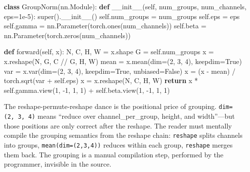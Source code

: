 \documentclass[11pt,titlepage]{article}
\newenvironment{Shaded}{}{}
\newcommand{\BuiltInTok}[1]{#1}
\newcommand{\ControlFlowTok}[1]{\textcolor[rgb]{0.00,0.44,0.13}{\textbf{#1}}}
\newcommand{\DecValTok}[1]{\textcolor[rgb]{0.25,0.63,0.44}{#1}}
\newcommand{\FloatTok}[1]{\textcolor[rgb]{0.25,0.63,0.44}{#1}}
\newcommand{\FunctionTok}[1]{\textcolor[rgb]{0.02,0.16,0.49}{#1}}
\newcommand{\KeywordTok}[1]{\textcolor[rgb]{0.00,0.44,0.13}{\textbf{#1}}}
\newcommand{\NormalTok}[1]{#1}
\newcommand{\OperatorTok}[1]{\textcolor[rgb]{0.40,0.40,0.40}{#1}}
\newcommand{\VariableTok}[1]{\textcolor[rgb]{0.10,0.09,0.49}{#1}}
\begin{document}
\begin{Shaded}
\begin{Highlighting}[]
\KeywordTok{class}\NormalTok{ GroupNorm(nn.Module):}
    \KeywordTok{def} \FunctionTok{__init__}\NormalTok{(}\VariableTok{self}\NormalTok{, num_groups, num_channels, eps}\OperatorTok{=}\FloatTok{1e-5}\NormalTok{):}
        \BuiltInTok{super}\NormalTok{().}\FunctionTok{__init__}\NormalTok{()}
        \VariableTok{self}\NormalTok{.num_groups }\OperatorTok{=}\NormalTok{ num_groups}
        \VariableTok{self}\NormalTok{.eps }\OperatorTok{=}\NormalTok{ eps}
        \VariableTok{self}\NormalTok{.gamma }\OperatorTok{=}\NormalTok{ nn.Parameter(torch.ones(num_channels))}
        \VariableTok{self}\NormalTok{.beta }\OperatorTok{=}\NormalTok{ nn.Parameter(torch.zeros(num_channels))}

    \KeywordTok{def}\NormalTok{ forward(}\VariableTok{self}\NormalTok{, x):}
\NormalTok{        N, C, H, W }\OperatorTok{=}\NormalTok{ x.shape}
\NormalTok{        G }\OperatorTok{=} \VariableTok{self}\NormalTok{.num_groups}
\NormalTok{        x }\OperatorTok{=}\NormalTok{ x.reshape(N, G, C }\OperatorTok{//}\NormalTok{ G, H, W)}
\NormalTok{        mean }\OperatorTok{=}\NormalTok{ x.mean(dim}\OperatorTok{=}\NormalTok{(}\DecValTok{2}\NormalTok{, }\DecValTok{3}\NormalTok{, }\DecValTok{4}\NormalTok{), keepdim}\OperatorTok{=}\VariableTok{True}\NormalTok{)}
\NormalTok{        var }\OperatorTok{=}\NormalTok{ x.var(dim}\OperatorTok{=}\NormalTok{(}\DecValTok{2}\NormalTok{, }\DecValTok{3}\NormalTok{, }\DecValTok{4}\NormalTok{), keepdim}\OperatorTok{=}\VariableTok{True}\NormalTok{, unbiased}\OperatorTok{=}\VariableTok{False}\NormalTok{)}
\NormalTok{        x }\OperatorTok{=}\NormalTok{ (x }\OperatorTok{-}\NormalTok{ mean) }\OperatorTok{/}\NormalTok{ torch.sqrt(var }\OperatorTok{+} \VariableTok{self}\NormalTok{.eps)}
\NormalTok{        x }\OperatorTok{=}\NormalTok{ x.reshape(N, C, H, W)}
        \ControlFlowTok{return}\NormalTok{ x }\OperatorTok{*} \VariableTok{self}\NormalTok{.gamma.view(}\DecValTok{1}\NormalTok{, }\DecValTok{-1}\NormalTok{, }\DecValTok{1}\NormalTok{, }\DecValTok{1}\NormalTok{) }\OperatorTok{+} \VariableTok{self}\NormalTok{.beta.view(}\DecValTok{1}\NormalTok{, }\DecValTok{-1}\NormalTok{, }\DecValTok{1}\NormalTok{, }\DecValTok{1}\NormalTok{)}
\end{Highlighting}
\end{Shaded}

The reshape-permute-reshape dance is the positional price of grouping.
\texttt{dim=(2,\ 3,\ 4)} means ``reduce over channel\_per\_group,
height, and width''---but those positions are only correct after the
reshape. The reader must mentally compile the grouping semantics from
the reshape chain: \texttt{reshape} splits channels into groups,
\texttt{mean(dim=(2,3,4))} reduces within each group, \texttt{reshape}
merges them back. The grouping is a manual compilation step, performed
by the programmer, invisible in the source.
\end{document}
